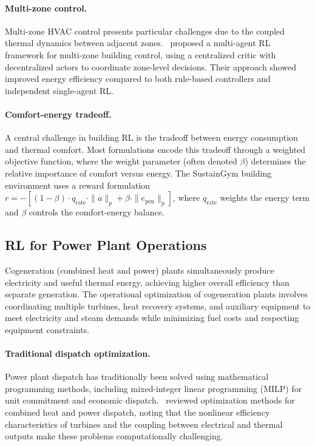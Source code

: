 \paragraph{Multi-zone control.} Multi-zone HVAC control presents particular challenges due to the coupled thermal dynamics between adjacent zones.~\citet{yu2021marl_building} proposed a multi-agent RL framework for multi-zone building control, using a centralized critic with decentralized actors to coordinate zone-level decisions. Their approach showed improved energy efficiency compared to both rule-based controllers and independent single-agent RL.

\paragraph{Comfort-energy tradeoff.} A central challenge in building RL is the tradeoff between energy consumption and thermal comfort. Most formulations encode this tradeoff through a weighted objective function, where the weight parameter (often denoted $\beta$) determines the relative importance of comfort versus energy. The SustainGym building environment uses a reward formulation $r = -[(1-\beta) \cdot q_{\text{rate}} \cdot \|a\|_p + \beta \cdot \|e_{\text{pen}}\|_p]$, where $q_{\text{rate}}$ weights the energy term and $\beta$ controls the comfort-energy balance.

\subsection{RL for Power Plant Operations}

Cogeneration (combined heat and power) plants simultaneously produce electricity and useful thermal energy, achieving higher overall efficiency than separate generation. The operational optimization of cogeneration plants involves coordinating multiple turbines, heat recovery systems, and auxiliary equipment to meet electricity and steam demands while minimizing fuel costs and respecting equipment constraints.

\paragraph{Traditional dispatch optimization.} Power plant dispatch has traditionally been solved using mathematical programming methods, including mixed-integer linear programming (MILP) for unit commitment and economic dispatch.~\citet{rong2006chp_review} reviewed optimization methods for combined heat and power dispatch, noting that the nonlinear efficiency characteristics of turbines and the coupling between electrical and thermal outputs make these problems computationally challenging.

